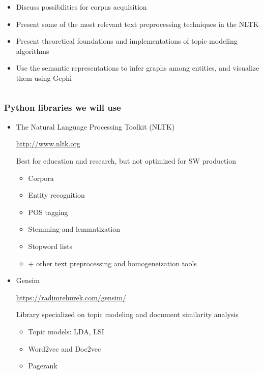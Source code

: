 \documentclass{beamer}
\begin{document}
\begin{frame}
\begin{columns}
\begin{column}{.6\textwidth}
\begin{itemize}
			\item Discuss possibilities for corpus acquisition
			\item Present some of the most relevant text preprocessing techniques in the NLTK
			\item Present theoretical foundations and implementations of topic modeling algorithms
			\item Use the semantic representations to infer graphs among entities, and visualize them using Gephi	
			
		\end{itemize}
	\end{column}

	\end{columns}

\end{frame}



\begin{frame}

	\frametitle{Python libraries we will use}

	\begin{itemize}
		\item The Natural Language Processing Toolkit (NLTK)
		
		\url{http://www.nltk.org}
		
		Best for education and research, but not optimized for SW production
		
			\begin{itemize}
				\item Corpora	
				\item Entity recognition
				\item POS tagging
				\item Stemming and lemmatization
				\item Stopword lists
				\item + other text preprocessing and homogeneization tools
				 
			\end{itemize}
		
		\item Gensim
		
		\url{https://radimrehurek.com/gensim/}
		
		Library specialized on topic modeling and document similarity analysis

			\begin{itemize}
				\item Topic models: LDA, LSI	
				\item Word2vec and Doc2vec
				\item Pagerank
				 
			\end{itemize}


	\end{itemize}	


\end{frame}
\end{document}
